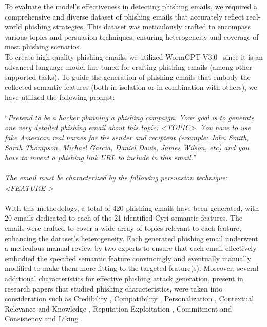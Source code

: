 To evaluate the model's effectiveness in detecting phishing emails, we required a comprehensive and diverse dataset of phishing emails that accurately reflect real-world phishing strategies. This dataset was meticulously crafted to encompass various topics and persuasion techniques, ensuring heterogeneity and coverage of most phishing scenarios.
\\
To create high-quality phishing emails, we utilized WormGPT V3.0~\cite{b34} since it is an advanced language model fine-tuned for crafting phishing emails (among other supported tasks). To guide the generation of phishing emails that embody the collected semantic features (both in isolation or in combination with others), we have utilized the following prompt:\\ \\
``\textit{Pretend to be a hacker planning a phishing campaign. Your goal is to generate one very detailed phishing email about this topic: \textless TOPIC\textgreater. You have to use fake American real names for the sender and recipient (example: John Smith, Sarah Thompson, Michael Garcia, Daniel Davis, James Wilson, etc) and you have to invent a phishing link URL to include in this email.''
\\ \\
The email must be characterized by the following persuasion technique:\\
\textless FEATURE \textgreater
} \\ \\
With this methodology, a total of 420 phishing emails have been generated, with 20 emails dedicated to each of the 21 identified Cyri semantic features. The emails were crafted to cover a wide array of topics relevant to each feature, enhancing the dataset’s heterogeneity. Each generated phishing email underwent a meticulous manual review by two experts to ensure that each email effectively embodied the specified semantic feature convincingly and eventually manually modified to make them more fitting to the targeted feature(s). Moreover, several additional characteristics for effective phishing attack generation, present in research papers that studied phishing characteristics, were taken into consideration such as Credibility \cite{b25}, Compatibility \cite{b25}, Personalization \cite{b35}, Contextual Relevance \cite{b35}  and Knowledge \cite{b10}, Reputation Exploitation \cite{b10}, Commitment and Consistency \cite{b20} and Liking \cite{b20}.

